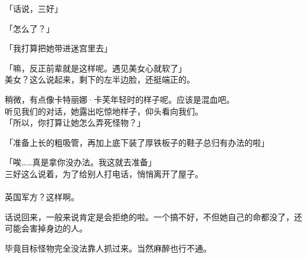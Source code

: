 「话说，三好」

「怎么了？」

「我打算把她带进迷宫里去」

「嘛，反正前辈就是这样呢。遇见美女心就软了」\\

美女？这么说起来，剩下的左半边脸，还挺端正的。

稍微，有点像卡特丽娜·卡芙年轻时的样子呢。应该是混血吧。\\

听见我们的对话，她露出吃惊地样子，仰头看向我们。\\

「所以，你打算让她怎么弄死怪物？」

「准备上长的粗吸管，再加上底下装了厚铁板子的鞋子总归有办法的啦」

「唉……真是拿你没办法。我这就去准备」\\

三好这么说着，为了给别人打电话，悄悄离开了屋子。\\

\\

英国军方？这样啊。

话说回来，一般来说肯定是会拒绝的啦。一个搞不好，不但她自己的命都没了，还可能会害掉身边的人。

毕竟目标怪物完全没法靠人抓过来。当然麻醉也行不通。\\

